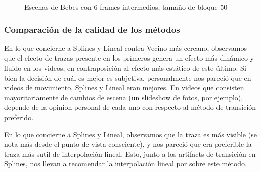 \begin{figure}
\hfill
{}
\hfill
{}
\hfill
\caption{Escenas de Bebes con 6 frames intermedios, tama\~no de bloque 50}
\label{BSE}
\end{figure}
\FloatBarrier

\subsubsection{Comparaci\'on de la calidad de los m\'etodos}
\par En lo que concierne a Splines y Lineal contra Vecino m\'as cercano, observamos que el efecto de trazas presente en los primeros genera un efecto m\'as din\'amico y fluido en los videos, en contraposici\'on al efecto m\'as est\'atico de este \'ultimo.
Si bien la decisi\'on de cu\'al es mejor es subjetiva, personalmente nos pareci\'o que en videos de movimiento, Splines y Lineal eran mejores.
En videos que consisten mayoritariamente de cambios de escena (un slideshow de fotos, por ejemplo), depende de la opinion personal de cada uno con respecto al m\'etodo de transici\'on preferido.
\par En lo que concierne a Splines y Lineal, observamos que la traza es m\'as visible (se nota m\'as desde el punto de vista consciente), y nos pareci\'o que era preferible la traza m\'as sutil de interpolaci\'on lineal.
Esto, junto a los artifacts de transici\'on en Splines, nos llevan a recomendar la interpolaci\'on lineal por sobre este m\'etodo.
